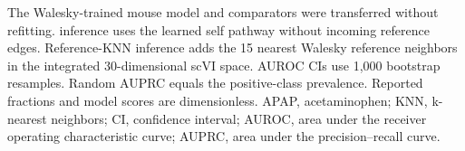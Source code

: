 The Walesky-trained mouse model and comparators were transferred without refitting. \SelfOnly{} inference uses the learned self pathway without incoming reference edges. Reference-KNN inference adds the 15 nearest Walesky reference neighbors in the integrated 30-dimensional scVI space. AUROC CIs use 1,000 bootstrap resamples. Random AUPRC equals the positive-class prevalence. Reported fractions and model scores are dimensionless. APAP, acetaminophen; KNN, k-nearest neighbors; CI, confidence interval; AUROC, area under the receiver operating characteristic curve; AUPRC, area under the precision--recall curve.